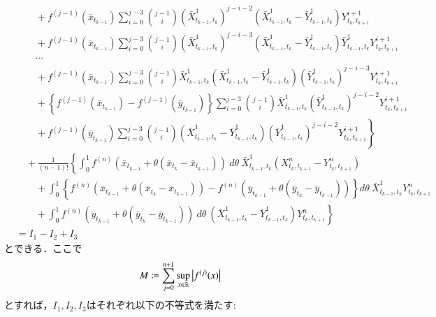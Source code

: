 \begin{prf}
\begin{description}
\begin{align}
							&\qquad + f^{(j-1)}(\bar{x}_{t_{k-1}}) \sum_{i=0}^{j-3} \binom{j-1}{i} \left( \bar{X}^1_{t_{k-1},t_k} \right)^{j-i-2} \left( \bar{X}^1_{t_{k-1},t_k} - \bar{Y}^1_{t_{k-1},t_k} \right) Y^{i+1}_{t_k,t_{k+1}} \\
							&\qquad + f^{(j-1)}(\bar{x}_{t_{k-1}}) \sum_{i=0}^{j-3} \binom{j-1}{i} \left( \bar{X}^1_{t_{k-1},t_k} \right)^{j-i-3} \left( \bar{X}^1_{t_{k-1},t_k} - \bar{Y}^1_{t_{k-1},t_k} \right) \bar{Y}^1_{t_{k-1},t_k} Y^{i+1}_{t_k,t_{k+1}} \\
							&\qquad \cdots \\
							&\qquad + f^{(j-1)}(\bar{x}_{t_{k-1}}) \sum_{i=0}^{j-3} \binom{j-1}{i} \bar{X}^1_{t_{k-1},t_k} \left( \bar{X}^1_{t_{k-1},t_k} - \bar{Y}^1_{t_{k-1},t_k} \right) \left( \bar{Y}^1_{t_{k-1},t_k} \right)^{j-i-3} Y^{i+1}_{t_k,t_{k+1}} \\
							&\qquad + \left\{ f^{(j-1)}(\bar{x}_{t_{k-1}}) - f^{(j-1)}(\bar{y}_{t_{k-1}}) \right\} \sum_{i=0}^{j-3} \binom{j-1}{i} \bar{X}^1_{t_{k-1},t_k} \left( \bar{Y}^1_{t_{k-1},t_k} \right)^{j-i-2} Y^{i+1}_{t_k,t_{k+1}} \\
							&\qquad + \left. f^{(j-1)}(\bar{y}_{t_{k-1}}) \sum_{i=0}^{j-3} \binom{j-1}{i} \left( \bar{X}^1_{t_{k-1},t_k} - \bar{Y}^1_{t_{k-1},t_k} \right) \left( \bar{Y}^1_{t_{k-1},t_k} \right)^{j-i-2} Y^{i+1}_{t_k,t_{k+1}} \right\} \\
						&\quad + \frac{1}{(n-1)!} \left\{ \int_0^1 f^{(n)}(\bar{x}_{t_{k-1}} + \theta(\bar{x}_{t_k}-\bar{x}_{t_{k-1}}))\ d\theta\ \bar{X}^1_{t_{k-1},t_k} \left( X^{n}_{t_k,t_{k+1}} - Y^{n}_{t_k,t_{k+1}} \right) \right. \\
							&\qquad + \int_0^1 \left\{ f^{(n)}(\bar{x}_{t_{k-1}} + \theta(\bar{x}_{t_k}-\bar{x}_{t_{k-1}})) - f^{(n)}(\bar{y}_{t_{k-1}} + \theta(\bar{y}_{t_k}-\bar{y}_{t_{k-1}})) \right\} d\theta\ \bar{X}^1_{t_{k-1},t_k} Y^{n}_{t_k,t_{k+1}} \\
							&\qquad + \left. \int_0^1 f^{(n)}(\bar{y}_{t_{k-1}} + \theta(\bar{y}_{t_k}-\bar{y}_{t_{k-1}}))\ d\theta\ \left( \bar{X}^1_{t_{k-1},t_k} - \bar{Y}^1_{t_{k-1},t_k} \right) Y^{n}_{t_k,t_{k+1}} \right\} \\
					&= I_1 - I_2 + I_3
				\end{align}
				とできる．ここで
				\begin{align}
					M \coloneqq \sum_{j=0}^{n+1}\operatorname*{sup}_{x \in \mathbb{R}} \left| f^{(j)}(x) \right|
				\end{align}
				とすれば，$I_1,I_2,I_3$はそれぞれ以下の不等式を満たす:
				\begin{align}

\end{align}
\end{description}
\end{prf}
